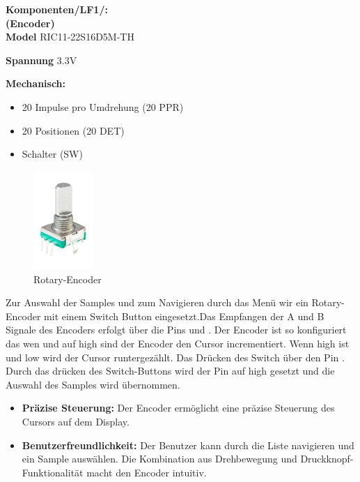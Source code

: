 
\textbf{Komponenten/LF1/:} \\


\textbf{(Encoder)} \\

\textbf{Model} RIC11-22S16D5M-TH

\textbf{Spannung} 3.3V

\textbf{Mechanisch:}
\begin{itemize}
	\item 20 Impulse pro Umdrehung (20 PPR)
	\item 20 Positionen (20 DET)
	\item Schalter (SW)
\end{itemize} 

	\begin{figure} %
	\vspace{-250pt + 0.02\textwidth}
	\hspace{0.07\textwidth} %
	\includegraphics[width=0.2\textwidth]{images/05_technische_spezifikation/Interface/Encoder.png} %
	\caption{Rotary-Encoder}
	\label{fig:rotary_encoder}
	\vspace{-20pt}
\end{figure}

Zur Auswahl der Samples und zum Navigieren durch das Menü wir ein Rotary-Encoder mit einem Switch Button eingesetzt.Das Empfangen der A und B Signale des Encoders erfolgt über die Pins  und . Der Encoder ist so konfiguriert das wen  und  auf high sind der Encoder den Cursor incrementiert. Wenn  high ist und  low wird der Cursor runtergezählt.
Das Drücken des Switch über den Pin . Durch das drücken des Switch-Buttons wird der Pin  auf high gesetzt und die Auswahl des Samples wird übernommen.

\begin{itemize}
	\item \textbf{Präzise Steuerung:} Der Encoder ermöglicht eine präzise Steuerung des Cursors auf dem Display.
	
	\item \textbf{Benutzerfreundlichkeit:} Der Benutzer kann durch die Liste navigieren und ein Sample auswählen. Die Kombination aus Drehbewegung und Druckknopf-Funktionalität macht den Encoder intuitiv.  
\end{itemize}

